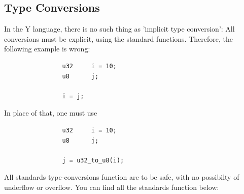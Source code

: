 \documentclass{scrartcl}
\begin{document}
        \subsection{Type Conversions}
            In the Y language, there is no such thing as 'implicit type conversion':
            All conversions must be explicit, using the standard functions.
            Therefore, the following example is wrong:
            \begin{lstlisting}
                u32     i = 10;
                u8      j;

                i = j;
            \end{lstlisting}
            In place of that, one must use
            \begin{lstlisting}
                u32     i = 10;
                u8      j;

                j = u32_to_u8(i);
            \end{lstlisting}
            All standards type-conversions function are to be safe, with no
            possibilty of underflow or overflow. You can find all the standards
            function below:
\\\\
\hspace*{-60px}
\end{document}
